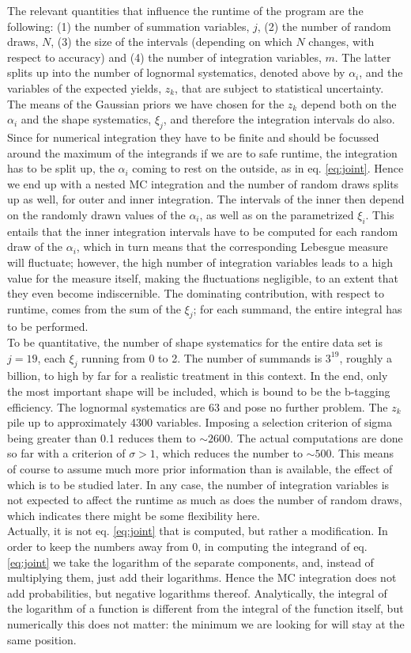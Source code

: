 \documentclass[aps,prb,twocolumn,showpacs,superscriptaddress,groupedaddress]{revtex4}  %
\begin{document}
The relevant quantities that influence the runtime of the program are the following: (1) the number of summation variables, $j$, (2) the number of random draws, $N$, (3) the size of the intervals (depending on which $N$ changes, with respect to accuracy) and (4) the number of integration variables, $m$. The latter splits up into the number of lognormal systematics, denoted above by $\alpha_{i}$, and the variables of the expected yields, $z_{k}$, that are subject to statistical uncertainty. The means of the Gaussian priors we have chosen for the $z_{k}$ depend both on the $\alpha_{i}$ and the shape systematics, $\xi_{j}$, and therefore the integration intervals do also. Since for numerical integration they have to be finite and should be focussed around the maximum of the integrands if we are to safe runtime, the integration has to be split up, the $\alpha_{i}$ coming to rest on the outside, as in eq. \ref{eq:joint}. Hence we end up with a nested MC integration and the number of random draws splits up as well, for outer and inner integration. The intervals of the inner then depend on the randomly drawn values of the $\alpha_{i}$, as well as on the parametrized $\xi_{i}$. This entails that the inner integration intervals have to be computed for each random draw of the $\alpha_{i}$, which in turn means that the corresponding Lebesgue measure will fluctuate; however, the high number of integration variables leads to a high value for the measure itself, making the fluctuations negligible, to an extent that they even become indiscernible. The dominating contribution, with respect to runtime, comes from the sum of the $\xi_{j}$; for each summand, the entire integral has to be performed.\\
To be quantitative, the number of shape systematics for the entire data set is $j=19$, each $\xi_{j}$ running from 0 to 2. The number of summands is $3^{19}$, roughly a billion, to high by far for a realistic treatment in this context. In the end, only the most important shape will be included, which is bound to be the b-tagging efficiency. The lognormal systematics are 63 and pose no further problem. The $z_{k}$ pile up to approximately 4300 variables. Imposing a selection criterion of sigma being greater than 0.1 reduces them to $\sim 2600$. The actual computations are done so far with a criterion of $\sigma > 1$, which reduces the number to $\sim 500$. This means of course to assume much more prior information than is available, the effect of which is to be studied later. In any case, the number of integration variables is not expected to affect the runtime as much as does the number of random draws, which indicates there might be some flexibility here.\\
Actually, it is not eq. \ref{eq:joint} that is computed, but rather a modification. In order to keep the numbers away from 0, in computing the integrand of eq. \ref{eq:joint} we take the logarithm of the separate components, and, instead of multiplying them, just add their logarithms. Hence the MC integration does not add probabilities, but negative logarithms thereof. Analytically, the integral of the logarithm of a function is different from the integral of the function itself, but numerically this does not matter: the minimum we are looking for will stay at the same position.
\end{document}
